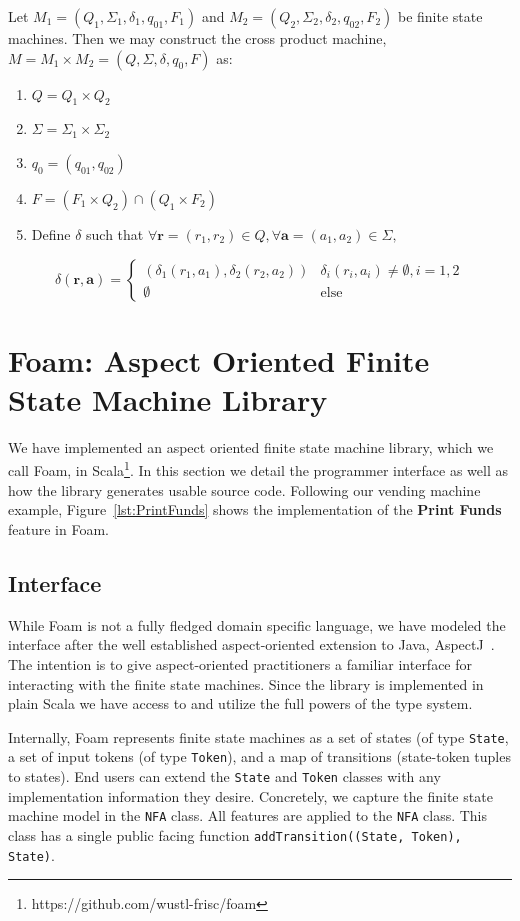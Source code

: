 \documentclass[sigplan,anonymous,review]{acmart}
\begin{document}
Let $M_1 = (Q_1, \Sigma_1, \delta_1, q_{01}, F_1)$ and $M_2 = (Q_2, \Sigma_2, \delta_2, q_{02}, F_2)$ be finite state machines. Then we may construct the cross product machine, $M = M_1 \times M_2 = (Q, \Sigma, \delta, q_0, F)$ as: 

\begin{enumerate}
    \item $Q = Q_1 \times Q_2$
    \item $\Sigma = \Sigma_1 \times \Sigma_2$
    \item $q_0 = (q_{01}, q_{02})$
    \item $F = (F_1 \times Q_2) \cap (Q_1 \times F_2)$
    \item Define $\delta$ such that $\forall \mathbf{r} = (r_1, r_2) \in Q, \forall \mathbf{a} = (a_1, a_2) \in \Sigma,$ 
\end{enumerate}
\[\delta(\mathbf r, \mathbf a) = \begin{cases}
    (\delta_1(r_1, a_1), \delta_2(r_2, a_2)) & \delta_i(r_i, a_i) \neq \emptyset, i = 1, 2\\
    \emptyset & \mathrm{else}
\end{cases}\]


\section{Foam: Aspect Oriented Finite State Machine Library}
We have implemented an aspect oriented finite state machine library, which we call Foam,  in Scala\footnote{https://github.com/wustl-frisc/foam}. In this section we detail the programmer interface as well as how the library generates usable source code. Following our vending machine example, Figure~\ref{lst:PrintFunds} shows the implementation of the \textbf{Print Funds} feature in Foam.

\subsection{Interface}
While Foam is not a fully fledged domain specific language, we have modeled the interface after the well established aspect-oriented extension to Java, AspectJ~\cite{}. The intention is to give aspect-oriented practitioners a familiar interface for interacting with the finite state machines. Since the library is implemented in plain Scala we have access to and utilize the full powers of the type system. 

Internally, Foam represents finite state machines as a set of states (of type \texttt{State}, a set of input tokens (of type \texttt{Token}), and a map of transitions (state-token tuples to states). End users can extend the \texttt{State} and \texttt{Token} classes with any implementation information they desire. Concretely, we capture the finite state machine model in the \texttt{NFA} class. All features are applied to the \texttt{NFA} class. This class has a single public facing function \texttt{addTransition((State, Token), State)}.
\end{document}
